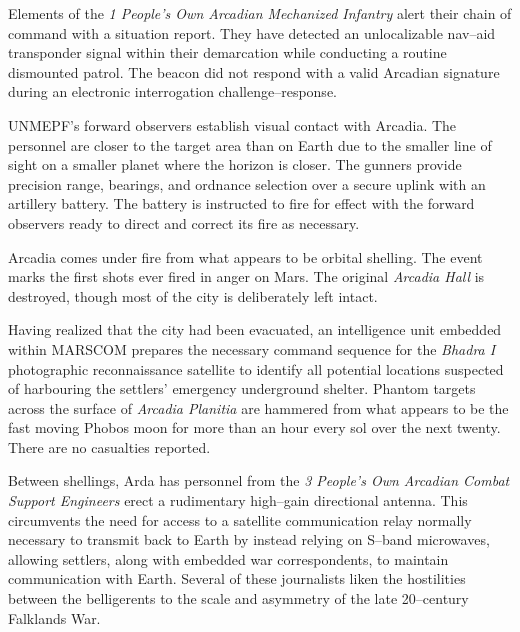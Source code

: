 

Elements of the {\it 1 People's Own Arcadian Mechanized Infantry} alert their chain of command with a situation report. They have detected an unlocalizable nav--aid transponder signal within their demarcation while conducting a routine dismounted patrol. The beacon did not respond with a valid Arcadian signature during an electronic interrogation challenge--response.
\StopTimelineDate

UNMEPF's forward observers establish visual contact with Arcadia. The personnel are closer to the target area than on Earth due to the smaller line of sight on a smaller planet where the horizon is closer. The gunners provide precision range, bearings, and ordnance selection over a secure uplink with an artillery battery. The battery is instructed to fire for effect with the forward observers ready to direct and correct its fire as necessary.

Arcadia comes under fire from what appears to be orbital shelling. The event marks the first shots ever fired in anger on Mars. The original {\it Arcadia Hall} is destroyed, though most of the city is deliberately left intact. 

Having realized that the city had been evacuated, an intelligence unit embedded within MARSCOM prepares the necessary command sequence for the {\it Bhadra I} photographic reconnaissance satellite to identify all potential locations suspected of harbouring the settlers' emergency underground shelter. Phantom targets across the surface of {\it Arcadia Planitia} are hammered from what appears to be the fast moving Phobos moon for more than an hour every sol over the next twenty. There are no casualties reported.

Between shellings, Arda has personnel from the {\it 3 People's Own Arcadian Combat Support Engineers} erect a rudimentary high--gain directional antenna. This circumvents the need for access to a satellite communication relay normally necessary to transmit back to Earth by instead relying on S--band microwaves, allowing settlers, along with embedded war correspondents, to maintain communication with Earth. Several of these journalists liken the hostilities between the belligerents to the scale and asymmetry of the late 20--century Falklands War.

